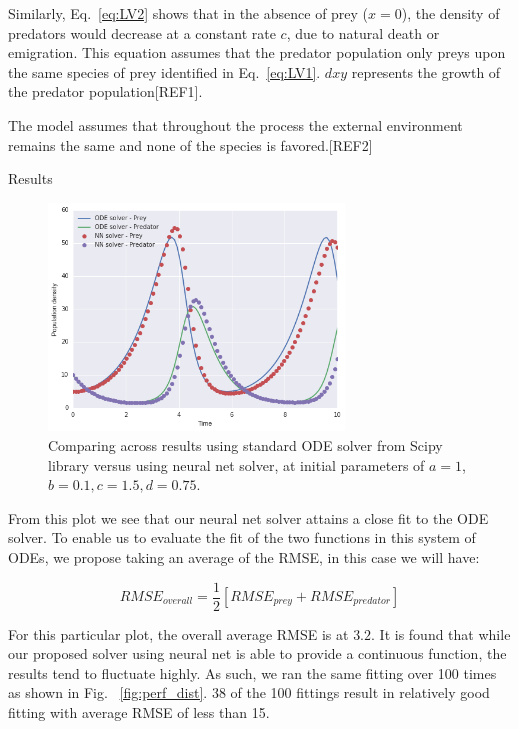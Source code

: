 \documentclass[11pt]{article}
\begin{document}
Similarly, Eq.~\ref{eq:LV2} shows that in the absence of prey ($x = 0$), the density of predators would decrease at a constant rate $c$, due to natural death or emigration. This equation assumes that the predator population only preys upon the same species of prey identified in Eq.~\ref{eq:LV1}. $dxy$ represents the growth of the predator population[REF1].

The model assumes that throughout the process the external environment remains the same and none of the species is favored.[REF2]

Results 
\break

\begin{figure}
\centering
\includegraphics[width=0.7\textwidth]{LV_compare.png}
      \caption{Comparing across results using standard ODE solver from Scipy library versus using neural net solver, at initial parameters of $a = 1$, $b = 0.1, c = 1.5, d = 0.75$.\label{fig:LVFig}}
\end{figure}

From this plot we see that our neural net solver attains a close fit to the ODE solver. To enable us to evaluate the fit of the two functions in this system of ODEs, we propose taking an average of the RMSE, in this case we will have:

\begin{equation}
RMSE_{overall} = \frac{1}{2}[RMSE_{prey} + RMSE_{predator}]
\end{equation}

For this particular plot, the overall average RMSE is at $3.2$. It is found that while our proposed solver using neural net is able to provide a continuous function, the results tend to fluctuate highly. As such, we ran the same fitting over 100 times as shown in Fig. ~\ref{fig:perf_dist}. 38 of the 100 fittings result in relatively good fitting with average RMSE of less than 15.
\end{document}
